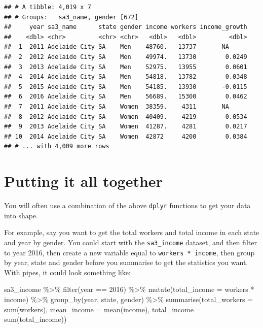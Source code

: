 \documentclass[
]{book}
\newenvironment{Shaded}{\begin{snugshade}}{\end{snugshade}}
\newcommand{\AttributeTok}[1]{\textcolor[rgb]{0.77,0.63,0.00}{#1}}
\newcommand{\DecValTok}[1]{\textcolor[rgb]{0.00,0.00,0.81}{#1}}
\newcommand{\FunctionTok}[1]{\textcolor[rgb]{0.00,0.00,0.00}{#1}}
\newcommand{\NormalTok}[1]{#1}
\newcommand{\SpecialCharTok}[1]{\textcolor[rgb]{0.00,0.00,0.00}{#1}}
\begin{document}
\begin{verbatim}
## # A tibble: 4,019 x 7
## # Groups:   sa3_name, gender [672]
##     year sa3_name      state gender income workers income_growth
##    <dbl> <chr>         <chr> <chr>   <dbl>   <dbl>         <dbl>
##  1  2011 Adelaide City SA    Men    48760.   13737       NA     
##  2  2012 Adelaide City SA    Men    49974.   13730        0.0249
##  3  2013 Adelaide City SA    Men    52975.   13955        0.0601
##  4  2014 Adelaide City SA    Men    54818.   13782        0.0348
##  5  2015 Adelaide City SA    Men    54185.   13930       -0.0115
##  6  2016 Adelaide City SA    Men    56689.   15300        0.0462
##  7  2011 Adelaide City SA    Women  38359.    4311       NA     
##  8  2012 Adelaide City SA    Women  40409.    4219        0.0534
##  9  2013 Adelaide City SA    Women  41287.    4281        0.0217
## 10  2014 Adelaide City SA    Women  42872     4200        0.0384
## # ... with 4,009 more rows
\end{verbatim}

\hypertarget{putting-it-all-together}{%
\section{Putting it all together}\label{putting-it-all-together}}

You will often use a combination of the above \texttt{dplyr} functions to get your data into shape.

For example, say you want to get the total workers and total income in each state and year by gender. You could start with the \texttt{sa3\_income} dataset, and then filter to year 2016, then create a new variable equal to \texttt{workers\ *\ income}, then group by year, state and gender before you summarise to get the statistics you want. With pipes, it could look something like:

\begin{Shaded}
\begin{Highlighting}[]
\NormalTok{sa3\_income }\SpecialCharTok{\%\textgreater{}\%} 
  \FunctionTok{filter}\NormalTok{(year }\SpecialCharTok{==} \DecValTok{2016}\NormalTok{) }\SpecialCharTok{\%\textgreater{}\%} 
  \FunctionTok{mutate}\NormalTok{(}\AttributeTok{total\_income =}\NormalTok{ workers }\SpecialCharTok{*}\NormalTok{ income) }\SpecialCharTok{\%\textgreater{}\%} 
  \FunctionTok{group\_by}\NormalTok{(year, state, gender) }\SpecialCharTok{\%\textgreater{}\%} 
  \FunctionTok{summarise}\NormalTok{(}\AttributeTok{total\_workers =} \FunctionTok{sum}\NormalTok{(workers),}
            \AttributeTok{mean\_income =} \FunctionTok{mean}\NormalTok{(income),}
            \AttributeTok{total\_income =} \FunctionTok{sum}\NormalTok{(total\_income))}
\end{Highlighting}
\end{Shaded}
\end{document}
